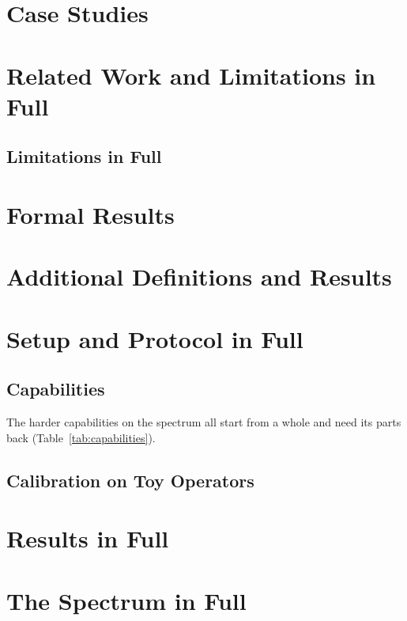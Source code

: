 \documentclass{article}
\theoremstyle{plain}
\theoremstyle{remark}
\begin{document}
\section{Case Studies}
\label{app:cases}


\clearpage
\section{Related Work and Limitations in Full}
\label{app:related}


\subsection{Limitations in Full}
\label{app:limits}


\section{Formal Results}
\label{app:proofs}


\section{Additional Definitions and Results}
\label{app:defs}
\label{app:extra}


\section{Setup and Protocol in Full}
\label{app:setup}
\label{app:protocol}
\subsection{Capabilities}
The harder capabilities on the spectrum all start from a whole and need its parts back (Table~\ref{tab:capabilities}).

\subsection{Calibration on Toy Operators}
\label{app:calibration}



\section{Results in Full}
\label{app:results}


\section{The Spectrum in Full}
\label{app:spectrum}

\end{document}
